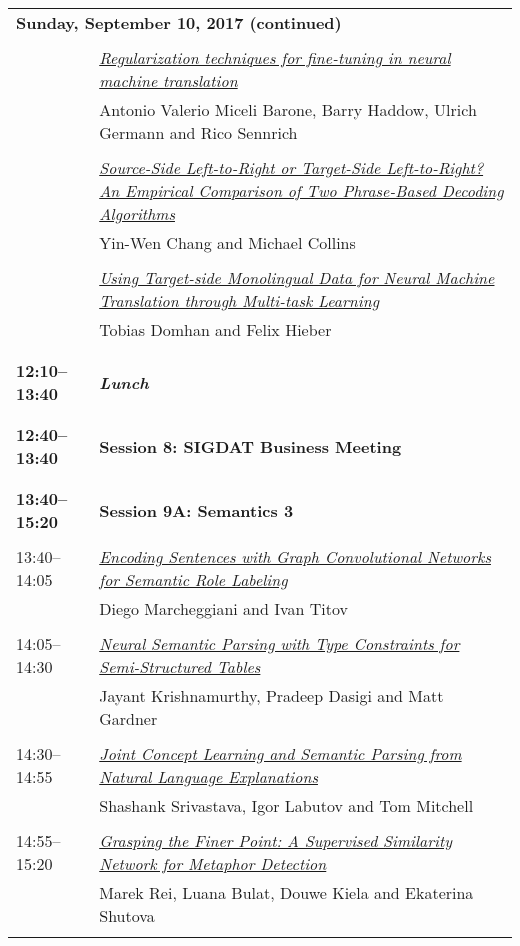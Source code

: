 \begin{tabular}{p{20mm}p{128mm}}
\\
\multicolumn{2}{l}{\bf Sunday, September 10, 2017 (continued)} \\\\
 & \hyperlink{page.1488}{\em Regularization techniques for fine-tuning in neural machine translation}\\
         & Antonio Valerio Miceli Barone, Barry Haddow, Ulrich Germann and Rico Sennrich \\
\\

 & \hyperlink{page.1494}{\em Source-Side Left-to-Right or Target-Side Left-to-Right? An Empirical Comparison of Two Phrase-Based Decoding Algorithms}\\
         & Yin-Wen Chang and Michael Collins \\
\\

 & \hyperlink{page.1499}{\em Using Target-side Monolingual Data for Neural Machine Translation through Multi-task Learning}\\
         & Tobias Domhan and Felix Hieber \\
\\

\\{\bf 12:10--13:40} & {\bf\em Lunch} \\
\\
\\{\bf 12:40--13:40} & {\bf Session 8: SIGDAT Business Meeting} \\
\\
\\{\bf 13:40--15:20} & {\bf Session 9A: Semantics 3 } \\
\\
13:40--14:05 & \hyperlink{page.1505}{\em Encoding Sentences with Graph Convolutional Networks for Semantic Role Labeling}\\
         & Diego Marcheggiani and Ivan Titov \\
\\

14:05--14:30 & \hyperlink{page.1515}{\em Neural Semantic Parsing with Type Constraints for Semi-Structured Tables}\\
         & Jayant Krishnamurthy, Pradeep Dasigi and Matt Gardner \\
\\

14:30--14:55 & \hyperlink{page.1526}{\em Joint Concept Learning and Semantic Parsing from Natural Language Explanations}\\
         & Shashank Srivastava, Igor Labutov and Tom Mitchell \\
\\

14:55--15:20 & \hyperlink{page.1536}{\em Grasping the Finer Point: A Supervised Similarity Network for Metaphor Detection}\\
         & Marek Rei, Luana Bulat, Douwe Kiela and Ekaterina Shutova \\
\\

\end{tabular}
